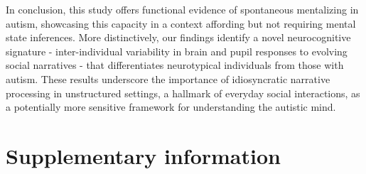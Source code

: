 In conclusion, this study offers functional evidence of spontaneous mentalizing in autism, showcasing this capacity in a context affording but not requiring mental state inferences. More distinctively, our findings identify a novel neurocognitive signature - inter-individual variability in brain and pupil responses to evolving social narratives - that differentiates neurotypical individuals from those with autism. These results underscore the importance of idiosyncratic narrative processing in unstructured settings, a hallmark of everyday social interactions, as a potentially more sensitive framework for understanding the autistic mind.

\section*{Supplementary information}



